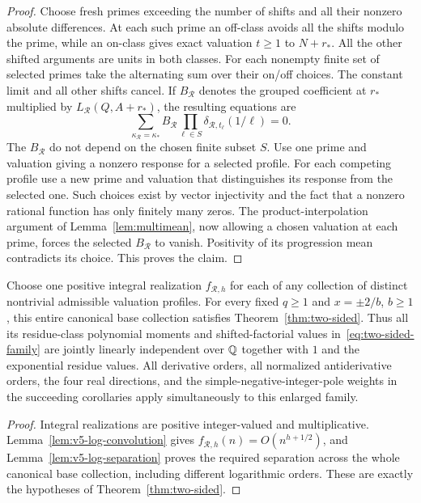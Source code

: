 \begin{proof}
Choose fresh primes exceeding the number of shifts and all their nonzero
absolute differences. At each such prime an off-class avoids all the shifts modulo
the prime, while an on-class gives exact valuation $t\geq1$ to $N+r_*$.
All the other shifted arguments are units in both classes.
For each nonempty finite set of selected primes take the alternating sum
over their on/off choices. The constant limit and all other shifts cancel.
If $B_{\mathcal R}$ denotes the grouped coefficient at $r_*$ multiplied by
$L_{\mathcal R}(Q,A+r_*)$, the resulting equations are
\[
 \sum_{\kappa_{\mathcal R}=\kappa_*}
 B_{\mathcal R}\prod_{\ell\in S}
            \delta_{\mathcal R,t_\ell}(1/\ell)=0.
\]
The $B_{\mathcal R}$ do not depend on the chosen finite subset $S$.
Use one prime and valuation giving a nonzero response for a selected
profile. For each competing profile use a new prime and valuation that
distinguishes its response from the selected one. Such choices exist by
vector injectivity and the fact that a nonzero rational function has only
finitely many zeros. The product-interpolation argument of
Lemma~\ref{lem:multimean}, now allowing a chosen valuation at each prime,
forces the selected $B_{\mathcal R}$ to vanish. Positivity of its
progression mean contradicts its choice. This proves the claim.
\end{proof}

\begin{theorem}
\label{thm:v5-log-profile-main}
Choose one positive integral realization $f_{\mathcal R,h}$ for each
of any collection of distinct nontrivial admissible valuation profiles.
For every fixed $q\geq1$ and $x=\pm2/b$, $b\geq1$, this entire canonical
base collection satisfies Theorem~\ref{thm:two-sided}.
Thus all its residue-class polynomial moments and shifted-factorial values
in~\eqref{eq:two-sided-family} are jointly linearly independent over $\mathbb Q$
together with $1$ and the exponential residue values.
All derivative orders, all normalized antiderivative orders, the four real
directions, and the simple-negative-integer-pole weights in the succeeding
corollaries apply simultaneously to this enlarged family.
\end{theorem}
\begin{proof}
Integral realizations are positive integer-valued and multiplicative.
Lemma~\ref{lem:v5-log-convolution} gives
$f_{\mathcal R,h}(n)=O(n^{h+1/2})$, and
Lemma~\ref{lem:v5-log-separation} proves the required separation across the
whole canonical base collection, including different logarithmic orders.
These are exactly the hypotheses of Theorem~\ref{thm:two-sided}.
\end{proof}

